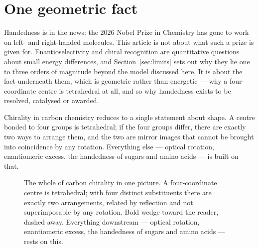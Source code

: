 \documentclass[11pt]{article}
\begin{document}
\section{One geometric fact}

Handedness is in the news: the 2026 Nobel Prize in Chemistry has gone to work on left- and
right-handed molecules. This article is not about what such a prize is given for. Enantioselectivity
and chiral recognition are quantitative questions about small energy differences, and
Section~\ref{sec:limits} sets out why they lie one to three orders of magnitude beyond the model
discussed here. It is about the fact underneath them, which is geometric rather than energetic ---
why a four-coordinate centre is tetrahedral at all, and so why handedness exists to be resolved,
catalysed or awarded.



Chirality in carbon chemistry reduces to a single statement about shape. A centre bonded to four
groups is tetrahedral; if the four groups differ, there are exactly two ways to arrange them, and
the two are mirror images that cannot be brought into coincidence by any rotation. Everything
else --- optical rotation, enantiomeric excess, the handedness of sugars and amino acids --- is
built on that.


\begin{figure}[t]
\centering
{}
\caption{The whole of carbon chirality in one picture. A four-coordinate centre is
tetrahedral; with four distinct substituents there are exactly two arrangements, related by
reflection and not superimposable by any rotation. Bold wedge toward the reader, dashed
away. Everything downstream --- optical rotation, enantiomeric excess, the handedness of
sugars and amino acids --- rests on this.}
\label{fig:enantiomers}
\end{figure}
\end{document}
